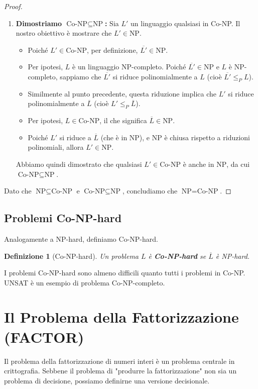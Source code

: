 \documentclass[a4paper]{article}
\newtheorem{definition}{Definizione}
\begin{document}
\begin{proof}
\begin{enumerate}
    \item \textbf{Dimostriamo $\text{Co-NP} \subseteq \text{NP}$:}
    Sia $L'$ un linguaggio qualsiasi in Co-NP. Il nostro obiettivo è mostrare che $L' \in \text{NP}$.
    \begin{itemize}
        \item Poiché $L' \in \text{Co-NP}$, per definizione, $\overline{L'} \in \text{NP}$.
        \item Per ipotesi, $L$ è un linguaggio NP-completo. Poiché $\overline{L'} \in \text{NP}$ e $L$ è NP-completo, sappiamo che $\overline{L'}$ si riduce polinomialmente a $L$ (cioè $\overline{L'} \le_P L$).
        \item Similmente al punto precedente, questa riduzione implica che $L'$ si riduce polinomialmente a $\overline{L}$ (cioè $L' \le_P \overline{L}$).
        \item Per ipotesi, $L \in \text{Co-NP}$, il che significa $\overline{L} \in \text{NP}$.
        \item Poiché $L'$ si riduce a $\overline{L}$ (che è in NP), e NP è chiusa rispetto a riduzioni polinomiali, allora $L' \in \text{NP}$.
    \end{itemize}
    Abbiamo quindi dimostrato che qualsiasi $L' \in \text{Co-NP}$ è anche in $\text{NP}$, da cui $\text{Co-NP} \subseteq \text{NP}$.
\end{enumerate}
Dato che $\text{NP} \subseteq \text{Co-NP}$ e $\text{Co-NP} \subseteq \text{NP}$, concludiamo che $\text{NP} = \text{Co-NP}$.
\end{proof}

\subsection{Problemi Co-NP-hard}
Analogamente a NP-hard, definiamo Co-NP-hard.
\begin{definition}[Co-NP-hard]
Un problema $L$ è \textbf{Co-NP-hard} se $\overline{L}$ è NP-hard.
\end{definition}
I problemi Co-NP-hard sono almeno difficili quanto tutti i problemi in Co-NP. UNSAT è un esempio di problema Co-NP-completo.

\section{Il Problema della Fattorizzazione (FACTOR)}

Il problema della fattorizzazione di numeri interi è un problema centrale in crittografia. Sebbene il problema di "produrre la fattorizzazione" non sia un problema di decisione, possiamo definirne una versione decisionale.
\end{document}
